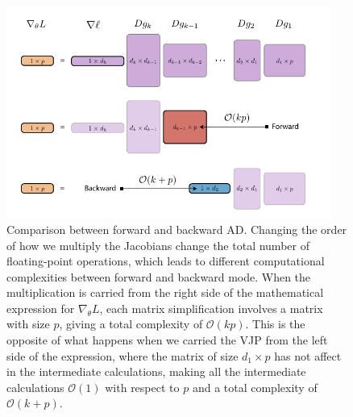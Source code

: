 \begin{figure}[t]
    \centering
    \includegraphics[width=0.95\textwidth]{tex/figures/VJP-AD.pdf}
    \caption{Comparison between forward and backward AD. Changing the order of how we multiply the Jacobians change the total number of floating-point operations, which leads to different computational complexities between forward and backward mode. When the multiplication is carried from the right side of the mathematical expression for $\nabla_\theta L$, each matrix simplification involves a matrix with size $p$, giving a total complexity of $\mathcal O (kp)$. This is the opposite of what happens when we carried the VJP from the left side of the expression, where the matrix of size $d_1 \times p$ has not affect in the intermediate calculations, making all the intermediate calculations $\mathcal O (1)$ with respect to $p$ and a total complexity of $\mathcal O (k + p)$. }
    \label{fig:vjp-jvp}
\end{figure}
